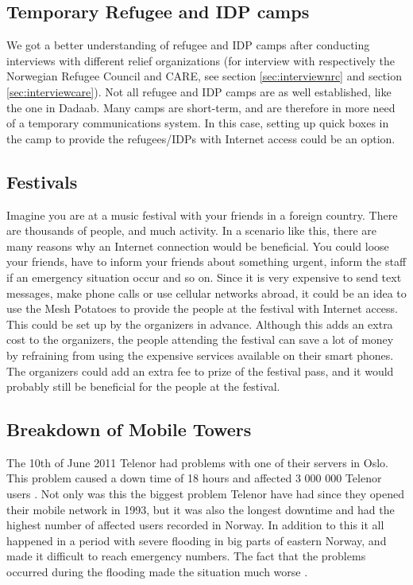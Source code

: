 \subsection{Temporary Refugee and IDP camps}
We got a better understanding of refugee and IDP camps after conducting interviews with different relief organizations (for interview with respectively the Norwegian Refugee Council and CARE, see section \ref{sec:interviewnrc} and section \ref{sec:interviewcare}). 
Not all refugee and IDP camps are as well established, like the one in Dadaab. Many camps are short-term, and are therefore in more need of a temporary communications system. In this case, setting up \gls{quick} boxes in the camp to provide the refugees/IDPs with Internet access could be an option. 

\subsection{Festivals}
Imagine you are at a music festival with your friends in a foreign country. There are thousands of people, and much activity. In a scenario like this, there are many reasons why an Internet connection would be beneficial. You could loose your friends, have to inform your friends about something urgent, inform the staff if an emergency situation occur and so on. Since it is very expensive to send text messages, make phone calls or use cellular networks abroad, it could be an idea to use the Mesh Potatoes to provide the people at the festival with Internet access. This could be set up by the organizers in advance. Although this adds an extra cost to the organizers, the people attending the festival can save a lot of money by refraining from using the expensive services available on their smart phones. The organizers could add an extra fee to prize of the festival pass, and it would probably still be beneficial for the people at the festival. 

\subsection{Breakdown of Mobile Towers}

The 10th of June 2011 Telenor had problems with one of their servers in Oslo. This problem caused a down time of 18 hours and affected 3 000 000 Telenor users \cite{listeNedetid}. Not only was this the biggest problem Telenor have had since they opened their mobile network in 1993, but it was also the longest downtime and had the highest number of affected users recorded in Norway. In addition to this it all happened in a period with severe flooding in big parts of eastern Norway, and made it difficult to reach emergency numbers. The fact that the problems occurred during the flooding made the situation much worse \cite{TelenorNede}.
